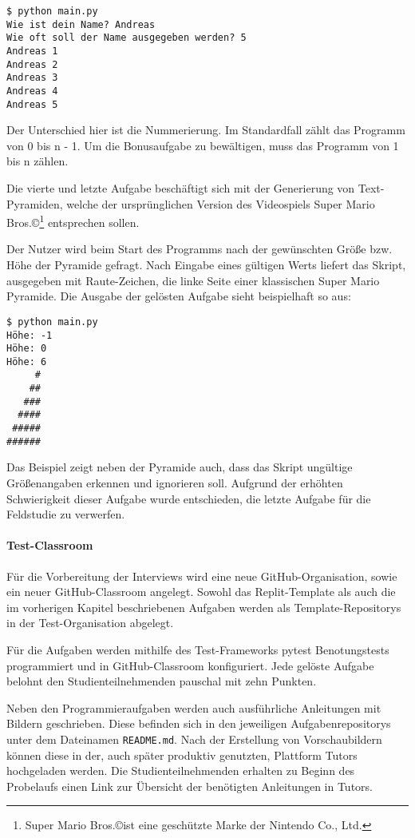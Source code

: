 \begin{lstlisting}[style=Bash]
$ python main.py
Wie ist dein Name? Andreas
Wie oft soll der Name ausgegeben werden? 5
Andreas 1
Andreas 2
Andreas 3
Andreas 4
Andreas 5
\end{lstlisting}

Der Unterschied hier ist die Nummerierung. Im Standardfall zählt das Programm
von 0 bis n - 1. Um die Bonusaufgabe zu bewältigen, muss das Programm von 1 bis
n zählen.

Die vierte und letzte Aufgabe beschäftigt sich mit der Generierung von
Text-Pyramiden, welche der ursprünglichen Version des Videospiels Super Mario
Bros.\copyright\footnote{Super Mario Bros.\copyright ist eine geschützte Marke
der Nintendo Co., Ltd.} entsprechen sollen. \parencite{git-repo:mario-less}

Der Nutzer wird beim Start des Programms nach der gewünschten Größe bzw. Höhe
der Pyramide gefragt. Nach Eingabe eines gültigen Werts liefert das Skript,
ausgegeben mit Raute-Zeichen, die linke Seite einer klassischen Super Mario
Pyramide. Die Ausgabe der gelösten Aufgabe sieht beispielhaft so aus:

\begin{lstlisting}[style=Bash]
$ python main.py
Höhe: -1
Höhe: 0
Höhe: 6
     #
    ##
   ###
  ####
 #####
######
\end{lstlisting}

Das Beispiel zeigt neben der Pyramide auch, dass das Skript ungültige
Größenangaben erkennen und ignorieren soll. Aufgrund der erhöhten Schwierigkeit
dieser Aufgabe wurde entschieden, die letzte Aufgabe für die Feldstudie zu
verwerfen.

\paragraph{Test-Classroom}
Für die Vorbereitung der Interviews wird eine neue GitHub-Organisation, sowie
ein neuer GitHub-Classroom angelegt. Sowohl das Replit-Template als auch die im
vorherigen Kapitel beschriebenen Aufgaben werden als Template-Repositorys in
der Test-Organisation abgelegt.

Für die Aufgaben werden mithilfe des Test-Frameworks pytest Benotungstests
programmiert und in GitHub-Classroom konfiguriert. Jede gelöste Aufgabe belohnt
den Studienteilnehmenden pauschal mit zehn Punkten.

Neben den Programmieraufgaben werden auch ausführliche Anleitungen mit Bildern
geschrieben. Diese befinden sich in den jeweiligen Aufgabenrepositorys unter dem
Dateinamen \texttt{README.md}. Nach der Erstellung von Vorschaubildern können
diese in der, auch später produktiv genutzten, Plattform Tutors hochgeladen
werden. Die Studienteilnehmenden erhalten zu Beginn des Probelaufs einen Link
zur Übersicht der benötigten Anleitungen in Tutors.

